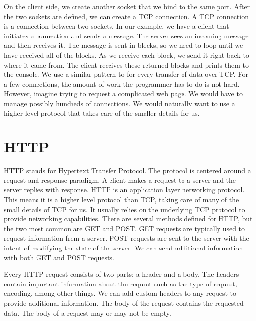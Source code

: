 On the client side, we create another socket that we bind to the same port.
After the two sockets are defined, we can create a TCP connection.
A TCP connection is a connection between two sockets.
In our example, we have a client that initiates a connection and sends a message.
The server sees an incoming message and then receives it.
The message is sent in blocks, so we need to loop until we have received all of the blocks.
As we receive each block, we send it right back to where it came from.
The client receives these returned blocks and prints them to the console.
We use a similar pattern to for every transfer of data over TCP.
For a few connections, the amount of work the programmer has to do is not hard.
However, imagine trying to request a complicated web page.
We would have to manage possibly hundreds of connections.
We would naturally want to use a higher level protocol that takes care of the smaller details for us.

\section*{HTTP}
HTTP stands for Hypertext Transfer Protocol.
The protocol is centered around a request and response paradigm.
A client makes a request to a server and the server replies with response.
HTTP is an application layer networking protocol.
This means it is a higher level protocol than TCP, taking care of many of the small details of TCP for us.
It usually relies on the underlying TCP protocol to provide networking capabilities.
There are several methods defined for HTTP, but the two most common are GET and POST.
GET requests are typically used to request information from a server.
POST requests are sent to the server with the intent of modifying the state of the server.  We can send additional information with both GET and POST requests.

Every HTTP request consists of two parts: a header and a body.
The headers contain important information about the request such as the type of request, encoding, among other things.  
We can add custom headers to any request to provide additional information.
The body of the request contains the requested data.
The body of a request may or may not be empty.

